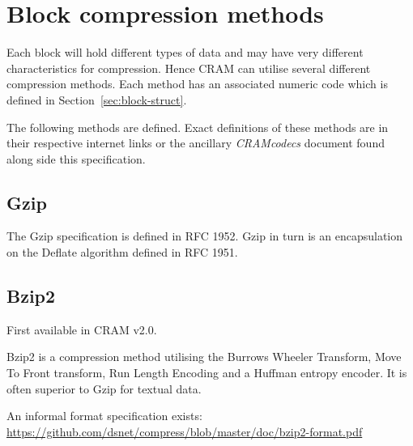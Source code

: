 \documentclass[a4paper]{article}
\begin{document}
% 
% 
% 
% 

\section{Block compression methods}

Each block will hold different types of data and may have very
different characteristics for compression.  Hence CRAM can utilise
several different compression methods. Each method has an associated numeric code which is defined in Section~\ref{sec:block-struct}.

The following methods are defined.
Exact definitions of these methods are in their respective internet links or the ancillary \textit{CRAMcodecs} document found along side this specification.

\subsection{Gzip}

The Gzip specification is defined in RFC 1952.
Gzip in turn is an encapsulation on the Deflate algorithm defined in RFC 1951.

\subsection{Bzip2}

First available in CRAM v2.0.

Bzip2 is a compression method utilising the Burrows Wheeler Transform, Move To Front transform, Run Length Encoding and a Huffman entropy encoder. 
It is often superior to Gzip for textual data.

An informal format specification exists:\\
\url{https://github.com/dsnet/compress/blob/master/doc/bzip2-format.pdf}
\end{document}
